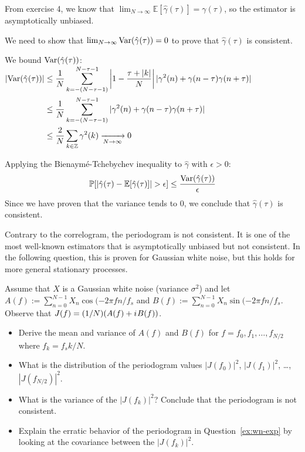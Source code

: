 \documentclass[11pt]{article}
\begin{document}
\begin{solution}
    From exercise 4, we know that $\lim_{N \to \infty} \mathbb{E}[\hat{\gamma}(\tau)] = \gamma(\tau)$, so the estimator is asymptotically unbiased.

    We need to show that $\lim_{N \to \infty} \mathrm{Var}(\hat{\gamma}(\tau)) = 0$ to prove that $\hat{\gamma}(\tau)$ is consistent. 
    
    We bound $\mathrm{Var} (\hat{\gamma}(\tau))$:\\
    $\begin{aligned}
            |\mathrm{Var} (\hat{\gamma}(\tau))|
            &\leq \frac{1}{N} \sum_{k = -(N - \tau - 1)}^{N - \tau - 1} \left| 1 - \frac{\tau + |k|}{N}\right| |\gamma^2 (n) + \gamma (n - \tau) \gamma (n + \tau)|\\
            &\leq \frac{1}{N} \sum_{k = -(N - \tau - 1)}^{N - \tau - 1} |\gamma^2 (n) + \gamma (n - \tau) \gamma (n + \tau)|\\
            &\leq \frac{2}{N} \sum_{k \in \mathbb{Z}} \gamma^2 (k) \xrightarrow[N \to \infty]{} 0 
    \end{aligned}$

    Applying the Bienaymé-Tchebychev inequality to $\hat{\gamma}$ with $\epsilon > 0$:
    $$\mathbb{P}[|\hat{\gamma}(\tau) - \mathbb{E}[\hat{\gamma}(\tau)]| > \epsilon] \leq \frac{\mathrm{Var} (\hat{\gamma}(\tau))}{\epsilon}$$
    Since we have proven that the variance tends to 0, we conclude that $\hat{\gamma}(\tau)$ is consistent.
\end{solution}
\vspace{1cm}




Contrary to the correlogram, the periodogram is not consistent.
It is one of the most well-known estimators that is asymptotically unbiased but not consistent.
In the following question, this is proven for Gaussian white noise, but this holds for more general stationary processes.
\begin{exercise}
    Assume that $X$ is a Gaussian white noise (variance $\sigma^2$) and let $A(f):=\sum_{n=0}^{N-1} X_n \cos(-2\pi f n/f_s$ and $B(f):=\sum_{n=0}^{N-1} X_n \sin(-2\pi f n/f_s$.
    Observe that $J(f) = (1/N) (A(f) + {i\mkern1mu} B(f))$.
    \begin{itemize}
        \item Derive the mean and variance of $A(f)$ and $B(f)$ for $f=f_0, f_1,\dots, f_{N/2}$ where $f_k=f_s k/N$.
        \item What is the distribution of the periodogram values $|J(f_0)|^2$, $|J(f_1)|^2$, \dots, $|J(f_{N/2})|^2$.
        \item What is the variance of the $|J(f_k)|^2$? Conclude that the periodogram is not consistent.
        \item Explain the erratic behavior of the periodogram in Question~\ref{ex:wn-exp} by looking at the covariance between the $|J(f_k)|^2$.
    \end{itemize}
    
\end{exercise}
\end{document}
